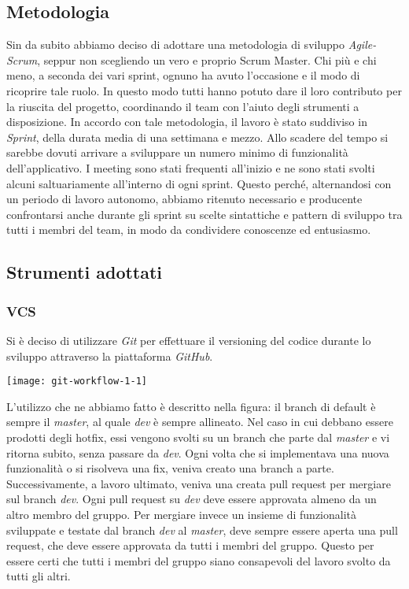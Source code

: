 \subsection{Metodologia}
Sin da subito abbiamo deciso di adottare una metodologia di sviluppo \textit{Agile-Scrum}, seppur non scegliendo un vero e proprio Scrum Master.
Chi più e chi meno, a seconda dei vari sprint, ognuno ha avuto l'occasione e il modo di ricoprire tale ruolo.
In questo modo tutti hanno potuto dare il loro contributo per la riuscita del progetto, coordinando il team con l'aiuto degli strumenti a disposizione.
In accordo con tale metodologia, il lavoro è stato suddiviso in \textit{Sprint}, della durata media di una settimana e mezzo.
Allo scadere del tempo si sarebbe dovuti arrivare a sviluppare un numero minimo di funzionalità dell'applicativo.
I meeting sono stati frequenti all'inizio e ne sono stati svolti alcuni saltuariamente all'interno di ogni sprint.
Questo perché, alternandosi con un periodo di lavoro autonomo, abbiamo ritenuto necessario e producente confrontarsi anche durante gli sprint su scelte sintattiche e pattern di sviluppo tra tutti i membri del team, in modo da condividere conoscenze ed entusiasmo.
\subsection{Strumenti adottati}
\subsubsection{VCS}
Si è deciso di utilizzare \textit{Git} per effettuare il versioning del codice durante lo sviluppo attraverso la piattaforma \textit{GitHub}.
\begin{center}
    \texttt{[image: git-workflow-1-1]}
\end{center}
L’utilizzo che ne abbiamo fatto è descritto nella figura: il branch di default è sempre il \textit{master}, al quale \textit{dev} è sempre allineato.
Nel caso in cui debbano essere prodotti degli hotfix, essi vengono svolti su un branch che parte dal \textit{master} e vi ritorna subito, senza passare da \textit{dev}.
Ogni volta che si implementava una nuova funzionalità o si risolveva una fix, veniva creato una branch a parte.
Successivamente, a lavoro ultimato, veniva una creata pull request per mergiare sul branch \textit{dev}.
Ogni pull request su \textit{dev} deve essere approvata almeno da un altro membro del gruppo.
Per mergiare invece un insieme di funzionalità sviluppate e testate dal branch \textit{dev} al \textit{master}, deve sempre essere aperta una pull request, che deve essere approvata da tutti i membri del gruppo.
Questo per essere certi che tutti i membri del gruppo siano consapevoli del lavoro svolto da tutti gli altri.

